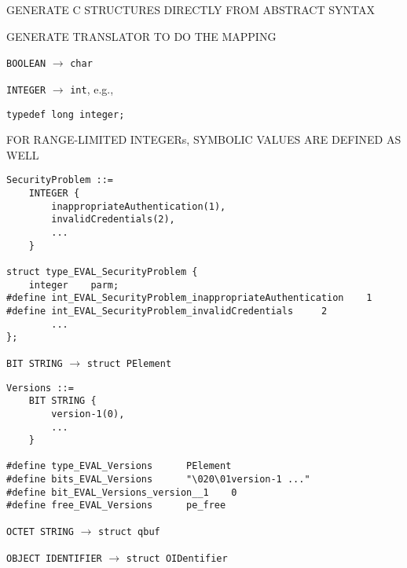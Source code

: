 \begin{bwslide}

\begin{nrtc}
\item	GENERATE C STRUCTURES DIRECTLY FROM ABSTRACT SYNTAX

\item	GENERATE TRANSLATOR TO DO THE MAPPING
\end{nrtc}
\end{bwslide}


\begin{bwslide}

\begin{nrtc}
\item	\verb"BOOLEAN" $\rightarrow$ \verb"char"

\item	\verb"INTEGER" $\rightarrow$ \verb"int", e.g.,
    \begin{nrtc}
    \item	\verb"typedef long integer;"
    \end{nrtc}
\end{nrtc}
\end{bwslide}


\begin{bwslide}

\begin{nrtc}
\item	FOR RANGE-LIMITED INTEGERs, SYMBOLIC VALUES ARE DEFINED AS WELL
\small\begin{verbatim}
SecurityProblem ::=
    INTEGER {
        inappropriateAuthentication(1),
        invalidCredentials(2),
        ...
    }

struct type_EVAL_SecurityProblem {
    integer    parm;
#define int_EVAL_SecurityProblem_inappropriateAuthentication    1
#define int_EVAL_SecurityProblem_invalidCredentials     2
        ...
};
\end{verbatim}
\end{nrtc}
\end{bwslide}


\begin{bwslide}

\begin{nrtc}
\item	\verb"BIT STRING" $\rightarrow$ \verb"struct PElement"
\begin{verbatim}
Versions ::=
    BIT STRING {
        version-1(0),
        ...
    }

#define type_EVAL_Versions      PElement
#define bits_EVAL_Versions      "\020\01version-1 ..."
#define bit_EVAL_Versions_version__1    0
#define free_EVAL_Versions      pe_free
\end{verbatim}

\item	\verb"OCTET STRING" $\rightarrow$ \verb"struct qbuf"

\item	\verb"OBJECT IDENTIFIER" $\rightarrow$ \verb"struct OIDentifier"
\end{nrtc}
\end{bwslide}


